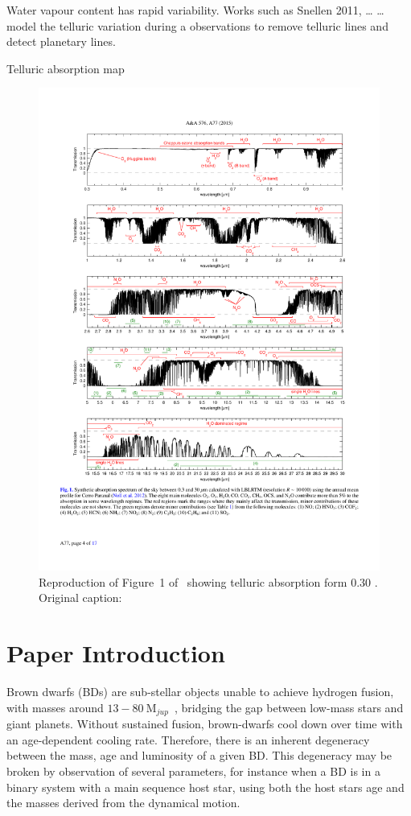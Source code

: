 Water vapour content has rapid variability. Works such as Snellen 2011, \ldots{} \ldots{}  model the telluric variation during a observations to remove telluric lines and detect planetary lines.



Telluric absorption map
\begin{figure}
    \centering
    \includegraphics[width=0.9\linewidth]{figures/advanced_material/cropped_molecfit_absorbtion}
    \caption{Reproduction of Figure~1 of~\citet{smette_molecfit_2015} showing telluric absorption form 0.30 \um. Original caption:}
    \label{fig:croppedmolecfitabsorbtion}
\end{figure}




\section{Paper Introduction}
\label{sec:intro}
Brown dwarfs (BDs) are sub-stellar objects unable to achieve hydrogen fusion, with masses around \(13-80~\textrm{M}_{jup} \)~\citep{chabrier_theory_2000}, bridging the gap between low-mass stars and giant planets. Without sustained fusion, brown-dwarfs cool down over time with an age-dependent cooling rate. Therefore, there is an inherent degeneracy between the mass, age and luminosity of a given BD\citep{burrows_nongray_1997}. This degeneracy may be broken by observation of several parameters, for instance when a BD is in a binary system with a main sequence host star, using both the host stars age and the masses derived from the dynamical motion.

